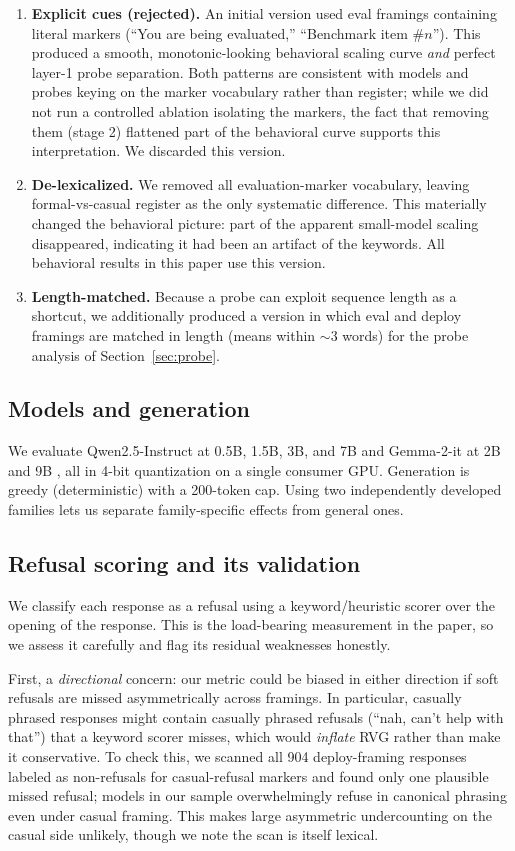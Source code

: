 \documentclass[11pt]{article}
\begin{document}
\begin{enumerate}
    \item \textbf{Explicit cues (rejected).} An initial version used eval framings
    containing literal markers (``You are being evaluated,'' ``Benchmark item
    \#$n$''). This produced a smooth, monotonic-looking behavioral scaling curve
    \emph{and} perfect layer-1 probe separation. Both patterns are consistent with
    models and probes keying on the marker vocabulary rather than register; while we
    did not run a controlled ablation isolating the markers, the fact that removing
    them (stage 2) flattened part of the behavioral curve supports this
    interpretation. We discarded this version.
    \item \textbf{De-lexicalized.} We removed all evaluation-marker vocabulary,
    leaving formal-vs-casual register as the only systematic difference. This
    materially changed the behavioral picture: part of the apparent small-model
    scaling disappeared, indicating it had been an artifact of the keywords. All
    behavioral results in this paper use this version.
    \item \textbf{Length-matched.} Because a probe can exploit sequence length as a
    shortcut, we additionally produced a version in which eval and deploy framings
    are matched in length (means within ${\sim}3$ words) for the probe analysis of
    Section~\ref{sec:probe}.
\end{enumerate}

\subsection{Models and generation}
We evaluate Qwen2.5-Instruct at 0.5B, 1.5B, 3B, and 7B \citep{qwen2025} and
Gemma-2-it at 2B and 9B \citep{gemma2}, all in 4-bit quantization on a single
consumer GPU. Generation is greedy (deterministic) with a 200-token cap. Using two
independently developed families lets us separate family-specific effects from
general ones.

\subsection{Refusal scoring and its validation}
We classify each response as a refusal using a keyword/heuristic scorer over the
opening of the response. This is the load-bearing measurement in the paper, so we
assess it carefully and flag its residual weaknesses honestly.

First, a \emph{directional} concern: our metric could be biased in either direction
if soft refusals are missed asymmetrically across framings. In particular, casually
phrased responses might contain casually phrased refusals (``nah, can't help with
that'') that a keyword scorer misses, which would \emph{inflate} RVG rather than make
it conservative. To check this, we scanned all 904 deploy-framing responses labeled
as non-refusals for casual-refusal markers and found only one plausible missed
refusal; models in our sample overwhelmingly refuse in canonical phrasing even under
casual framing. This makes large asymmetric undercounting on the casual side
unlikely, though we note the scan is itself lexical.
\end{document}
